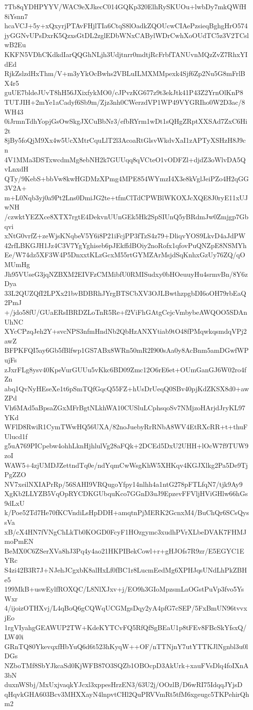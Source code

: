 7Tb8qYDHPYYV/WAC9eXJkecC014GQKp320ElhRySKUOu+lwbDy7mkQWfH8iYsnn7
hcaVCJ+5y+xQxyrjPTAvFHjlTIa6CtqS8lOadkZQOUcwCIAePzsieqBghgHrO574
jyGGNvUPsDxrK5QzxsGtDL2zglEDbWNxCABylWDrCwhXoOUdTC5z3V2TCslwB2Eu
KKFN5VDhCKdkdIarQQGhNLjh3Udjtnrr0mdtjRcFrbfTANUvnMQzZvZ7RhxYIdEd
RjkZslzdHxThm/V+m3yYkOcBwhs2VBLuILMXMMpexk4Sjf6Zp2Nu5G8mFrlBX4r5
guUE7bldeJUvT8hH56JXixfykMO0/cJPvzKG677z9t3ekJtk41P43Z2YrnOlKnP8
TUTJIH+2mYe1aCadyf6Sb9m/Zjz3nh0CWerzdVP1WP49VYGRIho0W2D3ac/8WH43
0iJrmnTdhYopjGsOwSkgJXCuBbNr3/efbRYrm1wDt1sQHgZRptXXSAd7ZxC6Hi2t
8jBy5foQjM9Xx4w5UcXMtrCquLlT2l3AcoaRtGlsvWkdvXaI1zAPTyXSHzH8J9cn
4V1MMa3DSTxwcdmMg8ebNH2k7GUUqq8qVCteO1vODFZl+djdZ3oWlvDA5QvLnxdH
QTy/9KebS+bbVw8kwHGDMzXPmg4MPE854WYmzI4X3e8kVglJeiPZo4H2qGG3V2A+
m+L0Nqb3yj0a9Pt2Lns0DmiJG2te+tfmClTdCPWBlWKOXJcXQE8J0ryE11xUJwNH
/czwktYEZXce8XTX7rgtE4DekvnUUnGEk5Hk2SpSIUnQ5yBRdmJw0Zmjgp7Gbqvi
xNtG0vrfZ+zeWjsKNqbeV5Y6i8P21iFcjPP3fTzS4z79+DliqvYOS9LkvD4aJdPW
42rfLBKGJH1Jz4C3V7YgYghiseb6pJEkffdBOiy2noRofx1qfovPuQNZpE8NSMYh
Ee/W74dz5XF3W4P5DnxxtKLzGcxM55rtGYMZArMsjdSqKnhxGzUy76ZQ/qOMUmHg
Jh95VUseG3jqNZBXM2EIVFzCMMibfU0RMISudxy0bHOeuuyHu4srmvBn/8Y6zDya
33L2QUZQfI2LPXx21bvBDBRhJYrgBTSCbXV3OJLBwthzpgbDI6oOH79rbEaQ2PmJ
+/jdo58fU/GUaERsIBRDZLoTnR5Re+f2ViFhGAtgCejcVmbybeAWQOO5SDAnUhNC
XYcCPzqJeh2Y+svcNPS3nfmHndNb2QbHzANXYtiab9tO48fPMqwkqsmdqVPj2awZ
BFPKFQI5ay6Gb5fBlfwp1GS7ABx8WRn50mR2I900sAa0y8AcBnm5amDGwfWPujFs
zJxrFLg8ysv40KpeVurGUUu5vKkc6BD09Zmc12O6rE6et+OUmGanGJ6W02ro4fZn
abq1QvNyHEseXe1t6pSmTQfGqcQ55FZ+hUsDrUeqQ0SBv40pjKdZKSX8d0+awZPd
Vh6MAd5aBpsaZGxMFrBgtNLkhWA10CUSluLCphsqoSv7NMjzoHArjdJryKL97YKd
WFlD8RwiR1CymTWwHQ56UXA/82noJuebyRrRNbA8WV4EtRXcRR+t+thuFUlucd1f
g5uA769PICpebw4ohhLknHjhlulVg28aFQk+2DCEd5DxU2UHH+lOcW7f9TUW9zoI
WAW5+4zjUMDJZettndTq0e/ndYqmCwWsgKhW5XHKqv4KGJXlkg2Pa5De9TjPgZZO
NV7xeilNXIAPrRp/56SAHI9VRQugoYfpy14nlhh4a1ntG278pFTLfqN7/tjk9Ay9
XgKb2LLYZB5VqOpRYCDKGUbquKco7GGnD3uJ9EpzevFFVljHViGHlw66hGs9dLxU
k/Poe52Td7He70fKCVndiLsHpDDH+amqtnPjMERK2GcnxM4/BuChQr6SCsQyssVa
xB/cX4HN7fVNgChLkTb0KOGD0FcyF1HOzgymc3xudhPVrXLbeDVAK7FHMJmoPmEN
BeMX0C6ZSerXVa8hJ3Pq4y4ao21HKPIBekCowl+r+gHJOfs7R9zr/E5EGYC1EYRc
S4zi42B3R7J+NJehJCgxbK8alHxLf0fBC1r8LucmEedMg6XPHJqsUNdLhPkZBHe5
199MkB+uswEylfROXQC/L8NlXJxv+j/EO9h3GIoMpzsmLaOGstPuVp3fvo5YsWxr
4/ijoizOTHXvj/L4qBoQ6gCQWqUCGMgsDqy2yA4pfG7cSEP/5FxBmUN96tvvxjEo
1rgVIyahgGEAWUP2TW+KdeKYTCvFQ5RfQfSgBEaU1p8tFEv8FBcSkYfsxQ/LW40i
GRnTQ80YkevqxfHbYuQ6d6t523hKyqW++OF/nTTNjnY7utYTTKJlNgnbl3u0lDGs
NZboTMf8SbYJkcaSd0KjWFB87O3SQZb1OBOcpD3AkUrk+xauFVsDlq4foIXnA3bN
duxnWSbj/MxUxjvaqkYJcxl3xppesHrzEN3/63U2j/OOzlB/D6wRI75IdqqJYjsD
qHqvkGHA603Bcv3MHXXayN4lnpvtCHl2QuPRVVmRt5tfM6xgeugc5TKPehirQhm2
